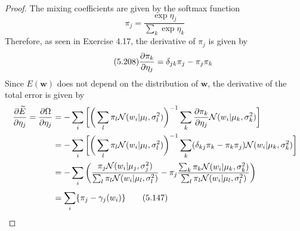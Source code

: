 \vspace{1em}

\begin{proof}
    The mixing coefficients are given by the softmax function
    \begin{equation}\label{eq:5.146}\tag{5.146}
        \pi_j = \frac{\exp{\eta_j}}{\sum_{k}^{} \exp{\eta_k}}
    \end{equation}
    Therefore, as seen in Exercise 4.17, the derivative of $\pi_j$ is 
    given by 
    \begin{equation}\label{eq:5.208}\tag{5.208}
        \pdv{\pi_k}{\eta_j} = \delta_{jk} \pi_j - \pi_j \pi_k
    \end{equation}
    Since $E(\mathbf{w})$ does not depend on the distribution of
    $\mathbf{w}$, the derivative of the total error is given by
    \begin{align*}
        \pdv{\widetilde{E}}{\eta_j}
        = \pdv{\Omega}{\eta_j}
        &= -\sum_{i}^{} \bigg[\bigg(\sum_{l}^{} \pi_l \mathcal{N}(w_i | \mu_l, \sigma_l^2)\bigg)^{-1}
        \sum_{k}^{} \pdv{\pi_k}{\eta_j} \mathcal{N}(w_i | \mu_k, \sigma_k^2)\bigg]\\ 
        &= -\sum_{i}^{} \bigg[\bigg(\sum_{l}^{} \pi_l \mathcal{N}(w_i | \mu_l, \sigma_l^2)\bigg)^{-1}
        \sum_{k}^{} (\delta_{kj} \pi_k - \pi_k \pi_j) \mathcal{N}(w_i | \mu_k, \sigma_k^2)\bigg] \\ 
        &= -\sum_{i}^{} \bigg(\frac{\pi_j \mathcal{N}(w_i | \mu_j, \sigma_j^2)}
            {\sum_{l}^{} \pi_l \mathcal{N}(w_i | \mu_l, \sigma_l^2)}
            - \pi_j \frac{\sum_{k}^{} \pi_k \mathcal{N}(w_i | \mu_k, \sigma_k^2)}
            {\sum_{l} {\pi_l \mathcal{N}(w_i | \mu_l, \sigma_l^2)}}\bigg) \\
        &= \sum_{i}^{} \{\pi_j - \gamma_j(w_i)\} \label{eq:5.147}\tag{5.147}
    \end{align*}
\end{proof}
